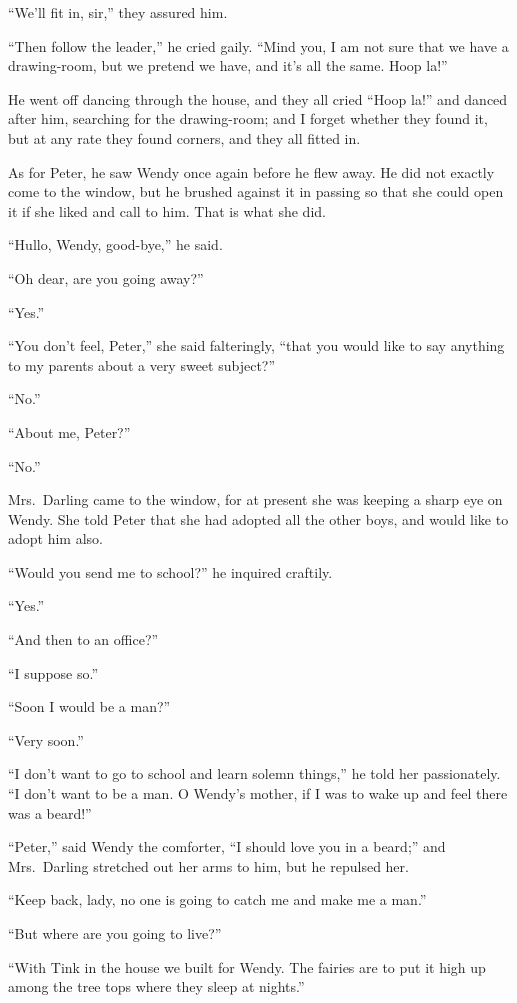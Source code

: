 ``We'll fit in, sir,'' they assured him.

``Then follow the leader,'' he cried gaily. ``Mind you, I am not sure that
we have a drawing-room, but we pretend we have, and it's all the same.
Hoop la!''

He went off dancing through the house, and they all cried ``Hoop la!''
and danced after him, searching for the drawing-room; and I forget
whether they found it, but at any rate they found corners, and they all
fitted in.

As for Peter, he saw Wendy once again before he flew away. He did not
exactly come to the window, but he brushed against it in passing so
that she could open it if she liked and call to him. That is what she
did.

``Hullo, Wendy, good-bye,'' he said.

``Oh dear, are you going away?''

``Yes.''

``You don't feel, Peter,'' she said falteringly, ``that you would like to
say anything to my parents about a very sweet subject?''

``No.''

``About me, Peter?''

``No.''

Mrs.\ Darling came to the window, for at present she was keeping a sharp
eye on Wendy. She told Peter that she had adopted all the other boys,
and would like to adopt him also.

``Would you send me to school?'' he inquired craftily.

``Yes.''

``And then to an office?''

``I suppose so.''

``Soon I would be a man?''

``Very soon.''

``I don't want to go to school and learn solemn things,'' he told her
passionately. ``I don't want to be a man. O Wendy's mother, if I was to
wake up and feel there was a beard!''

``Peter,'' said Wendy the comforter, ``I should love you in a beard;'' and
Mrs.\ Darling stretched out her arms to him, but he repulsed her.

``Keep back, lady, no one is going to catch me and make me a man.''

``But where are you going to live?''

``With Tink in the house we built for Wendy. The fairies are to put it
high up among the tree tops where they sleep at nights.''

